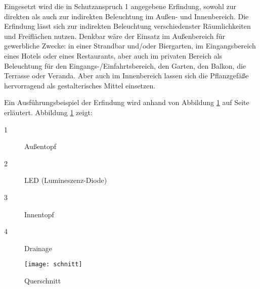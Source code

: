 \documentclass[ngerman, 12pt, a4paper]{scrartcl}
\begin{document}
Eingesetzt wird die in Schutzanspruch 1 angegebene Erfindung, sowohl zur direkten als auch zur
indirekten Beleuchtung im Außen- und Innenbereich. Die Erfindung lässt sich zur indirekten
Beleuchtung verschiedenster Räumlichkeiten und Freiflächen nutzen. Denkbar wäre der Einsatz im
Außenbereich für gewerbliche Zwecke: in einer Strandbar und/oder Biergarten, im Eingangsbereich
eines Hotels oder eines Restaurants, aber auch im privaten Bereich als Beleuchtung für den
Eingangs-/Einfahrtsbereich, den Garten, den Balkon, die Terrasse oder Veranda. Aber auch im
Innenbereich lassen sich die Pflanzgefäße hervorragend als gestalterisches Mittel einsetzen.\newline

Ein Ausführungsbeispiel der Erfindung wird anhand von Abbildung \ref{fig:schnitt} auf Seite
\pageref{fig:schnitt} erläutert. Abbildung \ref{fig:schnitt} zeigt:
\begin{description}
\item[1]
Außentopf

\item[2]
LED (Lumineszenz-Diode)

\item[3]
Innentopf

\item[4]
Drainage
\end{description}

\begin{figure}[]
\centering
\texttt{[image: schnitt]}
\caption{Querschnitt}
\label{fig:schnitt}
\end{figure}

\newpage
\goodbreak
\pagebreak
\end{document}
